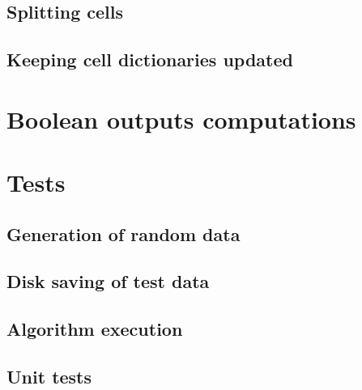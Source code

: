 \documentclass[11pt,oneside]{article}	%
\begin{document}
\subsection{Splitting cells}
\subsection{Keeping cell dictionaries updated }
\section{Boolean outputs computations}
\section{Tests}
\subsection{Generation of random data}
\subsection{Disk saving of test data}
\subsection{Algorithm execution}
\subsection{Unit tests}



\end{document}
